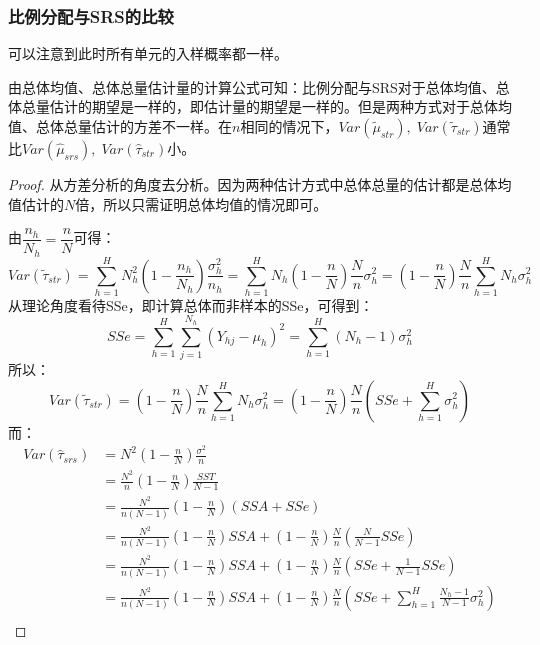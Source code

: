 \subsubsection{比例分配与SRS的比较}
可以注意到此时所有单元的入样概率都一样。\par
由总体均值、总体总量估计量的计算公式可知：比例分配与SRS对于总体均值、总体总量估计的期望是一样的，即估计量的期望是一样的。但是两种方式对于总体均值、总体总量估计的方差不一样。在$n$相同的情况下，$Var(\tilde{\mu}_{str}),\;Var(\tilde{\tau}_{str})$通常比$Var(\hat{\mu}_{srs}),\;Var(\hat{\tau}_{str})$小。
\begin{proof}
	从方差分析的角度去分析。因为两种估计方式中总体总量的估计都是总体均值估计的$N$倍，所以只需证明总体均值的情况即可。\par
	由$\dfrac{n_h}{N_h}=\dfrac{n}{N}$可得：
	\begin{equation*}
		Var(\tilde{\tau}_{str})
		=\sum_{h=1}^HN_h^2\left(1-\frac{n_h}{N_h}\right)\frac{\sigma_h^2}{n_h} =\sum_{h=1}^HN_h\left(1-\frac{n}{N}\right)\frac{N}{n}\sigma_h^2 =\left(1-\frac{n}{N}\right)\frac{N}{n}\sum_{h=1}^HN_h\sigma_h^2
	\end{equation*}
	从理论角度看待SSe，即计算总体而非样本的SSe，可得到：
	\begin{equation*}
		SSe=\sum_{h=1}^H\sum_{j=1}^{N_h}(Y_{hj}-\mu_h)^2=\sum_{h=1}^H(N_h-1)\sigma_h^2
	\end{equation*}
	所以：
	\begin{equation*}
		Var(\tilde{\tau}_{str})=\left(1-\frac{n}{N}\right)\frac{N}{n}\sum_{h=1}^HN_h\sigma_h^2=\left(1-\frac{n}{N}\right)\frac{N}{n}\left(SSe+\sum_{h=1}^H\sigma_h^2\right)
	\end{equation*}
	而：
	\begin{align*}
		Var(\hat{\tau}_{srs})
		&=N^2\left(1-\frac{n}{N}\right)\frac{\sigma^2}{n} \\
		&=\frac{N^2}{n}\left(1-\frac{n}{N}\right)\frac{SST}{N-1} \\
		&=\frac{N^2}{n(N-1)}\left(1-\frac{n}{N}\right)(SSA+SSe) \\
		&=\frac{N^2}{n(N-1)}\left(1-\frac{n}{N}\right)SSA+\left(1-\frac{n}{N}\right)\frac{N}{n}\left(\frac{N}{N-1}SSe\right) \\
		&=\frac{N^2}{n(N-1)}\left(1-\frac{n}{N}\right)SSA+\left(1-\frac{n}{N}\right)\frac{N}{n}\left(SSe+\frac{1}{N-1}SSe\right) \\
		&=\frac{N^2}{n(N-1)}\left(1-\frac{n}{N}\right)SSA+\left(1-\frac{n}{N}\right)\frac{N}{n}\left(SSe+\sum_{h=1}^H\frac{N_h-1}{N-1}\sigma_h^2\right) \\

\end{align*}
\end{proof}

